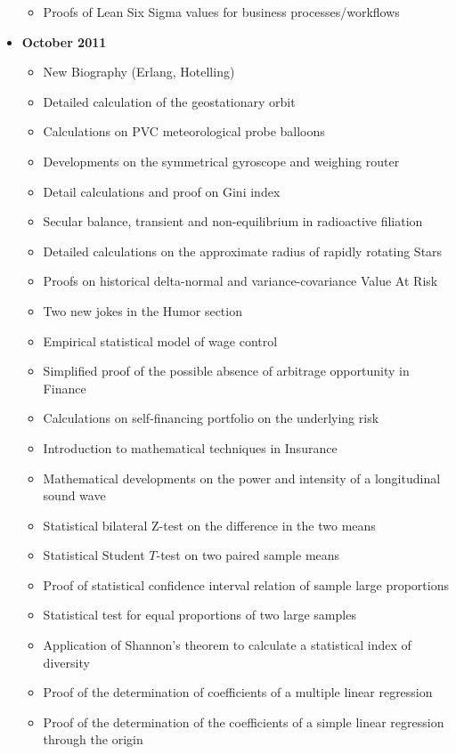 \documentclass[12pt,a4paper,twoside,openright]{report}
\theoremstyle{definition}
\theoremstyle{itexmp}
\numberwithin{equation}{section}
\begin{document}
\begin{itemize}
\begin{itemize}[noitemsep]
			\item Proofs of Lean Six Sigma values for business processes/workflows
		\end{itemize}
	\item \textbf{October 2011}
		\begin{itemize}[noitemsep]
			\item New Biography (Erlang, Hotelling)
			\item Detailed calculation of the geostationary orbit
			\item Calculations on PVC meteorological probe balloons
			\item Developments on the symmetrical gyroscope and weighing router
			\item Detail calculations and proof on Gini index
			\item Secular balance, transient and non-equilibrium in radioactive filiation
			\item Detailed calculations on the approximate radius of rapidly rotating Stars
			\item Proofs on historical delta-normal and variance-covariance Value At Risk
			\item Two new jokes in the Humor section
			\item Empirical statistical model of wage control
			\item Simplified proof of the possible absence of arbitrage opportunity in Finance
			\item Calculations on self-financing portfolio on the underlying risk
			\item Introduction to mathematical techniques in Insurance
			\item Mathematical developments on the power and intensity of a longitudinal sound wave
			\item Statistical bilateral Z-test on the difference in the two means
			\item Statistical Student $T$-test on two paired sample means
			\item Proof of statistical confidence interval relation of sample large proportions
			\item Statistical test for equal proportions of two large samples
			\item Application of Shannon's theorem to calculate a statistical index of diversity
			\item Proof of the determination of coefficients of a multiple linear regression
			\item Proof of the determination of the coefficients of a simple linear regression through the origin

\end{itemize}
\end{itemize}
\end{document}
